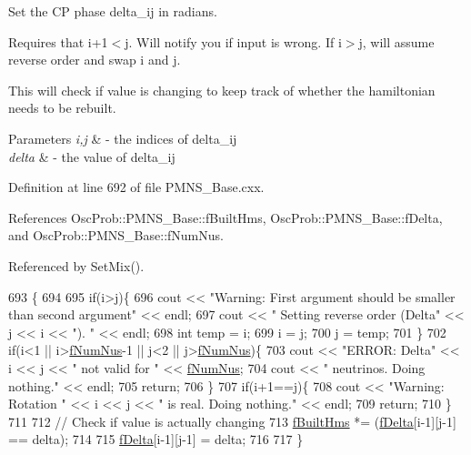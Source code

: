 Set the CP phase delta\+\_\+ij in radians.

Requires that i+1$<$j. Will notify you if input is wrong. If i$>$j, will assume reverse order and swap i and j.

This will check if value is changing to keep track of whether the hamiltonian needs to be rebuilt.


\begin{DoxyParams}{Parameters}
{\em i,j} & -\/ the indices of delta\+\_\+ij \\
\hline
{\em delta} & -\/ the value of delta\+\_\+ij \\
\hline
\end{DoxyParams}


Definition at line 692 of file P\+M\+N\+S\+\_\+\+Base.\+cxx.



References Osc\+Prob\+::\+P\+M\+N\+S\+\_\+\+Base\+::f\+Built\+Hms, Osc\+Prob\+::\+P\+M\+N\+S\+\_\+\+Base\+::f\+Delta, and Osc\+Prob\+::\+P\+M\+N\+S\+\_\+\+Base\+::f\+Num\+Nus.



Referenced by Set\+Mix().


\begin{DoxyCode}
693 \{
694 
695   \textcolor{keywordflow}{if}(i>j)\{
696     cout << \textcolor{stringliteral}{"Warning: First argument should be smaller than second argument"} << endl;
697     cout << \textcolor{stringliteral}{"         Setting reverse order (Delta"} << j << i << \textcolor{stringliteral}{"). "} << endl;
698     \textcolor{keywordtype}{int} temp = i;
699     i = j;
700     j = temp;
701   \}
702   \textcolor{keywordflow}{if}(i<1 || i>\hyperlink{classOscProb_1_1PMNS__Base_a24bb74bed63569dfe88b18fa6a08060e}{fNumNus}-1 || j<2 || j>\hyperlink{classOscProb_1_1PMNS__Base_a24bb74bed63569dfe88b18fa6a08060e}{fNumNus})\{
703     cout << \textcolor{stringliteral}{"ERROR: Delta"} << i << j << \textcolor{stringliteral}{" not valid for "} << \hyperlink{classOscProb_1_1PMNS__Base_a24bb74bed63569dfe88b18fa6a08060e}{fNumNus};
704     cout << \textcolor{stringliteral}{" neutrinos. Doing nothing."} << endl;
705     \textcolor{keywordflow}{return};
706   \}
707   \textcolor{keywordflow}{if}(i+1==j)\{
708     cout << \textcolor{stringliteral}{"Warning: Rotation "} << i << j << \textcolor{stringliteral}{" is real. Doing nothing."} << endl;
709     \textcolor{keywordflow}{return};
710   \}
711 
712   \textcolor{comment}{// Check if value is actually changing}
713   \hyperlink{classOscProb_1_1PMNS__Base_a9ac3cadeac8db1b90f3152f476244780}{fBuiltHms} *= (\hyperlink{classOscProb_1_1PMNS__Base_ab2a5fa40e689b221c8a7d2c17213810d}{fDelta}[i-1][j-1] == delta);
714 
715   \hyperlink{classOscProb_1_1PMNS__Base_ab2a5fa40e689b221c8a7d2c17213810d}{fDelta}[i-1][j-1] = delta;
716 
717 \}
\end{DoxyCode}
\mbox{\label{classOscProb_1_1PMNS__Fast_a63733b246e6d2e609ce3de7a65ba5b9f}} 
